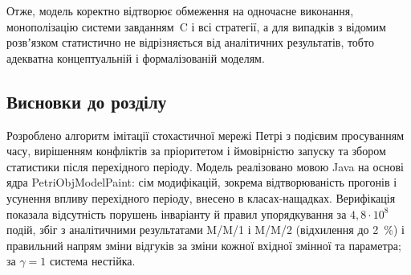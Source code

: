 Отже, модель коректно відтворює обмеження на одночасне виконання, монополізацію системи
завданням~C і всі стратегії, а для випадків з відомим розвʼязком статистично не відрізняється від
аналітичних результатів, тобто адекватна концептуальній і формалізованій моделям.

\subsection{Висновки до розділу}

Розроблено алгоритм імітації стохастичної мережі Петрі з подієвим просуванням часу, вирішенням
конфліктів за пріоритетом і ймовірністю запуску та збором статистики після перехідного періоду.
Модель реалізовано мовою Java на основі ядра PetriObjModelPaint: сім модифікацій, зокрема
відтворюваність прогонів і усунення впливу перехідного періоду, внесено в класах-нащадках. Верифікація показала відсутність порушень інваріанту
й правил упорядкування за $4{,}8\cdot10^8$ подій, збіг з аналітичними результатами M/M/1 і M/M/2
(відхилення до 2~\%) і правильний напрям зміни відгуків за зміни кожної вхідної змінної та
параметра; за $\gamma = 1$ система нестійка.
